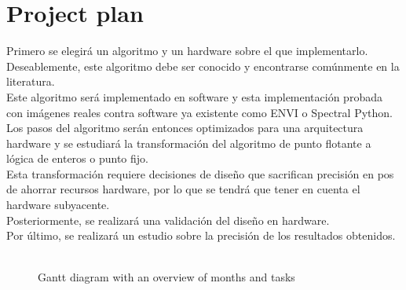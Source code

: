\section{Project plan}
Primero se elegirá un algoritmo y un hardware sobre el que implementarlo. Deseablemente, este algoritmo debe ser conocido y encontrarse comúnmente en la literatura.
\\
Este algoritmo será implementado en software y esta implementación probada con imágenes reales contra software ya existente como ENVI o Spectral Python.
\\
Los pasos del algoritmo serán entonces optimizados para una arquitectura hardware y se estudiará la transformación del algoritmo de punto flotante a lógica de enteros o punto fijo.
\\
Esta transformación requiere decisiones de diseño que sacrifican precisión en pos de ahorrar recursos hardware, por lo que se tendrá que tener en cuenta el hardware subyacente.
\\
Posteriormente, se realizará una validación del diseño en hardware.
\\
Por último, se realizará un estudio sobre la precisión de los resultados obtenidos.
\\
\\
    \begin{figure}[h!]
    \caption{Gantt diagram with an overview of months and tasks}
    \label{fig:gantt}
    \end{figure}
